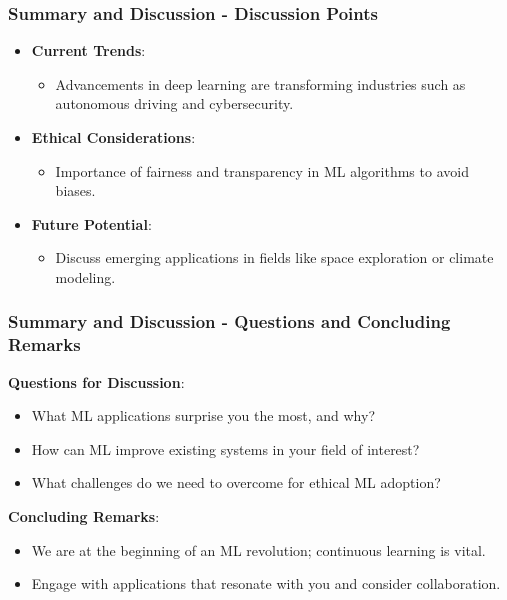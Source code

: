 \documentclass[aspectratio=169]{beamer}
\begin{document}
\begin{frame}[fragile]
    \frametitle{Summary and Discussion - Discussion Points}
    \begin{itemize}
        \item \textbf{Current Trends}: 
        \begin{itemize}
            \item Advancements in deep learning are transforming industries such as autonomous driving and cybersecurity.
        \end{itemize}
        
        \item \textbf{Ethical Considerations}: 
        \begin{itemize}
            \item Importance of fairness and transparency in ML algorithms to avoid biases.
        \end{itemize}
        
        \item \textbf{Future Potential}: 
        \begin{itemize}
            \item Discuss emerging applications in fields like space exploration or climate modeling.
        \end{itemize}
    \end{itemize}
\end{frame}

\begin{frame}[fragile]
    \frametitle{Summary and Discussion - Questions and Concluding Remarks}
    \textbf{Questions for Discussion}:
    \begin{itemize}
        \item What ML applications surprise you the most, and why?
        \item How can ML improve existing systems in your field of interest?
        \item What challenges do we need to overcome for ethical ML adoption?
    \end{itemize}

    \textbf{Concluding Remarks}:
    \begin{itemize}
        \item We are at the beginning of an ML revolution; continuous learning is vital.
        \item Engage with applications that resonate with you and consider collaboration.
    \end{itemize}
\end{frame}
\end{document}
